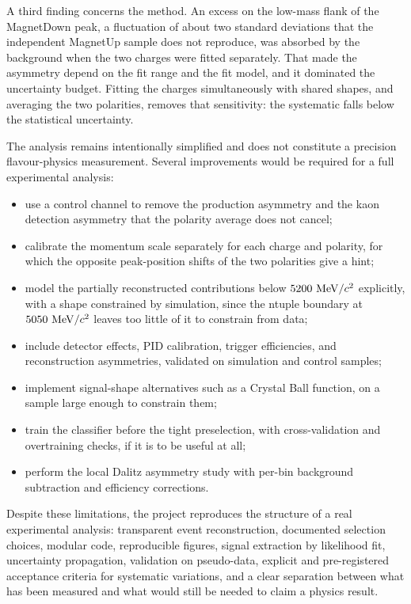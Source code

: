 A third finding concerns the method. An excess on the low-mass flank of the
MagnetDown \Bplus{} peak, a fluctuation of about two standard deviations that the
independent MagnetUp sample does not reproduce, was absorbed by the \Bplus{}
background when the two charges were fitted separately. That made the asymmetry
depend on the fit range and the fit model, and it dominated the uncertainty
budget. Fitting the charges simultaneously with shared shapes, and averaging the
two polarities, removes that sensitivity: the systematic falls below the
statistical uncertainty.

The analysis remains intentionally simplified and does not constitute a precision
flavour-physics measurement. Several improvements would be required for a full
experimental analysis:
\begin{itemize}
  \item use a control channel to remove the production asymmetry and the kaon
        detection asymmetry that the polarity average does not cancel;
  \item calibrate the momentum scale separately for each charge and polarity, for
        which the opposite peak-position shifts of the two polarities give a hint;
  \item model the partially reconstructed contributions below $5200~\mathrm{MeV}/c^2$
        explicitly, with a shape constrained by simulation, since the ntuple
        boundary at $5050~\mathrm{MeV}/c^2$ leaves too little of it to constrain from data;
  \item include detector effects, PID calibration, trigger efficiencies, and
        reconstruction asymmetries, validated on simulation and control samples;
  \item implement signal-shape alternatives such as a Crystal Ball function, on a
        sample large enough to constrain them;
  \item train the classifier before the tight preselection, with
        cross-validation and overtraining checks, if it is to be useful at all;
  \item perform the local Dalitz asymmetry study with per-bin background
        subtraction and efficiency corrections.
\end{itemize}

Despite these limitations, the project reproduces the structure of a real
experimental analysis: transparent event reconstruction, documented selection
choices, modular code, reproducible figures, signal extraction by likelihood fit,
uncertainty propagation, validation on pseudo-data, explicit and pre-registered
acceptance criteria for systematic variations, and a clear separation between
what has been measured and what would still be needed to claim a physics result.
